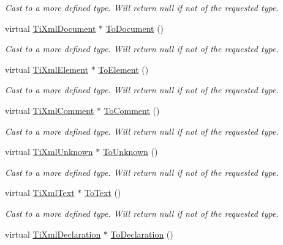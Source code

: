 \begin{DoxyCompactItemize}
\begin{DoxyCompactList}\small\item\em Cast to a more defined type. Will return null if not of the requested type. \end{DoxyCompactList}\item 
virtual \hyperlink{class_ti_xml_document}{Ti\-Xml\-Document} $\ast$ \hyperlink{class_ti_xml_node_a6a4c8ac28ee7a745d059db6691e03bae}{To\-Document} ()
\begin{DoxyCompactList}\small\item\em Cast to a more defined type. Will return null if not of the requested type. \end{DoxyCompactList}\item 
virtual \hyperlink{class_ti_xml_element}{Ti\-Xml\-Element} $\ast$ \hyperlink{class_ti_xml_node_aa65d000223187d22a4dcebd7479e9ebc}{To\-Element} ()
\begin{DoxyCompactList}\small\item\em Cast to a more defined type. Will return null if not of the requested type. \end{DoxyCompactList}\item 
virtual \hyperlink{class_ti_xml_comment}{Ti\-Xml\-Comment} $\ast$ \hyperlink{class_ti_xml_node_a383e06a0787f7063953934867990f849}{To\-Comment} ()
\begin{DoxyCompactList}\small\item\em Cast to a more defined type. Will return null if not of the requested type. \end{DoxyCompactList}\item 
virtual \hyperlink{class_ti_xml_unknown}{Ti\-Xml\-Unknown} $\ast$ \hyperlink{class_ti_xml_node_a06de5af852668c7e4af0d09c205f0b0d}{To\-Unknown} ()
\begin{DoxyCompactList}\small\item\em Cast to a more defined type. Will return null if not of the requested type. \end{DoxyCompactList}\item 
virtual \hyperlink{class_ti_xml_text}{Ti\-Xml\-Text} $\ast$ \hyperlink{class_ti_xml_node_a3ddfbcac78fbea041fad57e5c6d60a03}{To\-Text} ()
\begin{DoxyCompactList}\small\item\em Cast to a more defined type. Will return null if not of the requested type. \end{DoxyCompactList}\item 
virtual \hyperlink{class_ti_xml_declaration}{Ti\-Xml\-Declaration} $\ast$ \hyperlink{class_ti_xml_node_a4027136ca820ff4a636b607231b6a6df}{To\-Declaration} ()

\end{DoxyCompactItemize}
